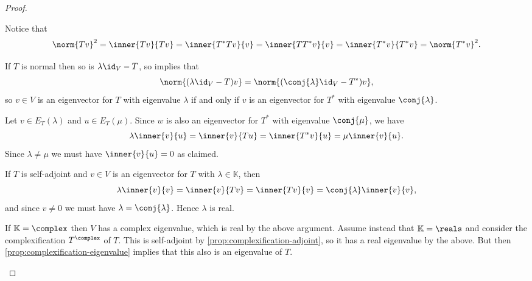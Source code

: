 \documentclass[a4paper, 11pt]{memoir}
\numberwithin{equation}{chapter}
\begin{document}
\begin{proof}
\begin{proofsec*}
    \item[\Namesubcref{enum:normal-adjoint-norm}]
    Notice that
    \begin{equation*}
        \norm{Tv}^2
            = \inner{Tv}{Tv}
            = \inner{T^*Tv}{v}
            = \inner{TT^*v}{v}
            = \inner{T^*v}{T^*v}
            = \norm{T^*v}^2.
    \end{equation*}

    \item[\Namesubcref{enum:normal-adjoint-eigenvalues}]
    If $T$ is normal then so is $\lambda \id_V - T$, so  implies that
    \begin{equation*}
        \norm{(\lambda \id_V - T)v}
            = \norm{(\conj{\lambda} \id_V - T^*)v},
    \end{equation*}
    so $v \in V$ is an eigenvector for $T$ with eigenvalue $\lambda$ if and only if $v$ is an eigenvector for $T^*$ with eigenvalue $\conj{\lambda}$.

    \item[\Namesubcref{enum:normal-orthogonal-eigenspaces}]
    Let $v \in E_T(\lambda)$ and $u \in E_T(\mu)$. Since $w$ is also an eigenvector for $T^*$ with eigenvalue $\conj{\mu}$, we have
    \begin{equation*}
        \lambda \inner{v}{u}
            = \inner{v}{Tu}
            = \inner{T^*v}{u}
            = \mu \inner{v}{u}.
    \end{equation*}
    Since $\lambda \neq \mu$ we must have $\inner{v}{u} = 0$ as claimed.

    \item[\Namesubcref{enum:self-adjoint-eigenvalues-exists-and-real}]
    If $T$ is self-adjoint and $v \in V$ is an eigenvector for $T$ with $\lambda \in \mathbb{K}$, then
    \begin{equation*}
        \lambda \inner{v}{v}
            = \inner{v}{Tv}
            = \inner{Tv}{v}
            = \conj{\lambda} \inner{v}{v},
    \end{equation*}
    and since $v \neq 0$ we must have $\lambda = \conj{\lambda}$. Hence $\lambda$ is real.

    If $\mathbb{K} = \complex$ then $V$ has a complex eigenvalue, which is real by the above argument. Assume instead that $\mathbb{K} = \reals$ and consider the complexification $T^\complex$ of $T$. This is self-adjoint by \cref{prop:complexification-adjoint}, so it has a real eigenvalue by the above. But then \cref{prop:complexification-eigenvalue} implies that this also is an eigenvalue of $T$.


\end{proofsec*}
\end{proof}
\end{document}

